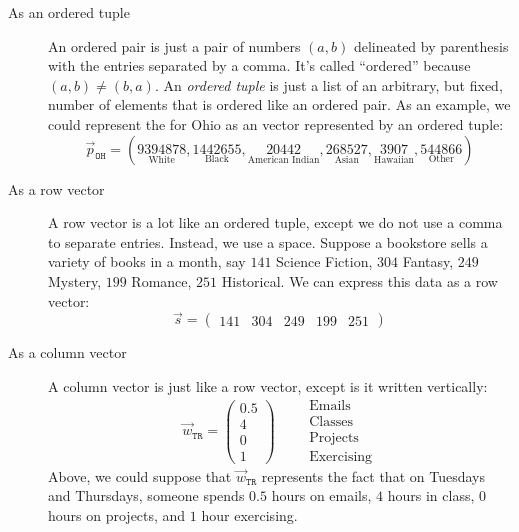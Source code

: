 \documentclass{ximera}
\begin{document}
\begin{concept}
\begin{description}
\item[As an ordered tuple] An ordered pair is just a pair of numbers
  $(a,b)$ delineated by parenthesis with the entries separated by a
  comma. It's called ``ordered'' because $(a,b) \ne (b,a)$. An \textit{ordered
  tuple} is just a list of an arbitrary, but fixed, number of elements
  that is ordered like an ordered pair. As an example, we could
  represent the  for Ohio as an vector
  represented by an ordered tuple:
  \[
  \vec{p}_{\texttt{OH}} = (\underset{\text{White}}{9394878},\underset{\text{Black}}{1442655},\underset{\text{American Indian}}{20442},\underset{\text{Asian}}{268527},\underset{\text{Hawaiian}}{3907},\underset{\text{Other}}{544866})
  \]
\item[As a row vector] A row vector is a lot like an ordered tuple,
  except we do not use a comma to separate entries. Instead, we use a
  space.  Suppose a bookstore sells a variety of books in a month, say
  $141$ Science Fiction,
  $304$ Fantasy,
  $249$ Mystery,
  $199$ Romance,
  $251$ Historical.
  We can express this data as a row vector:
  \[
  \vec{s} = \begin{pmatrix}141 & 304 & 249 & 199 & 251 \end{pmatrix}
  \]
\item[As a column vector] A column vector is just like a row vector,
  except is it written vertically:
  \[
  \vec{w}_{\texttt{TR}} = \begin{pmatrix}
    0.5\\ 4 \\ 0 \\ 1\end{pmatrix}
    \qquad
    \begin{array}{l}
    \text{Emails}\\
    \text{Classes}\\
    \text{Projects}\\
    \text{Exercising}
  \end{array}
  \]
  Above, we could suppose that $\vec{w}_{\texttt{TR}}$ represents the
  fact that on Tuesdays and Thursdays, someone spends $0.5$ hours on
  emails, $4$ hours in class, $0$ hours on projects, and $1$ hour
  exercising.
\end{description}
\end{concept}
\end{document}
